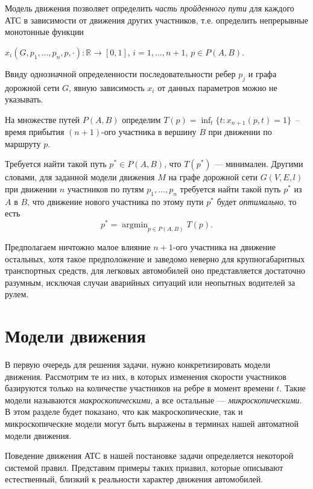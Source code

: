 \documentclass[12pt, a4paper]{article}
\DeclareMathOperator*{\argmin}{argmin}
\begin{document}
	Модель движения позволяет определить \textit{часть пройденного пути} для каждого АТС в зависимости от движения других участников, т.е. определить непрерывные монотонные функции
	\begin{center}
		$x_i(G, p_1, \dots, p_n, p, \cdot ) : \mathbb {R} \rightarrow [0 , 1] $, $i = 1, \dots, n+1$, $p \in P(A, B) $.
	\end{center}
	Ввиду однозначной определенности последовательности ребер $p_j$ и графа дорожной сети $G$, явную зависимость $x_i$ от данных параметров можно не указывать. 
	
	На множестве путей $P(A,B)$ определим $T(p) = \displaystyle \inf_t \{t : x_{n+1}(p, t) = 1\}$~-- время прибытия $(n+1)$-ого участника в вершину $B$ при движении по маршруту $p$. 
	\fi
	
	Требуется найти такой путь $p^* \in P(A, B)$, что $T(p^*)$ --- минимален. Другими словами, для заданной модели движения $M$ на графе дорожной сети $G(V, E, l)$ при движении $n$ участников по путям $p_1, \dots, p_n$ требуется найти такой путь $p^*$ из $A$ в $B$, что движение нового участника по этому пути $p^*$ будет \textit{оптимально}, то есть
	$$p^* = \argmin_{p \in P(A, B)} T(p).$$
	
	
	Предполагаем ничтожно малое влияние $n+1$-ого участника на движение остальных, 
	хотя такое предположение и заведомо неверно для крупногабаритных транспортных средств, для легковых автомобилей оно представляется достаточно разумным, исключая случаи аварийных ситуаций или неопытных водителей за рулем.
	
	\newpage
	\section{Модели движения}
	
	В первую очередь для решения задачи, нужно конкретизировать модели движения. Рассмотрим те из них, в которых изменения скорости участников базируются только на количестве участников на ребре в момент времени $t$. Такие модели называются \textit{макроскопическими}, а все остальные --- \textit{микроскопическими}. В этом разделе будет показано, что как макроскопические, так и микроскопические модели могут быть выражены в терминах нашей автоматной модели движения.
	
	Поведение движения АТС в нашей постановке задачи определяется некоторой системой правил. Представим примеры таких приавил, которые описывают естественный, близкий к реальности характер движения автомобилей.
	
\end{document}

